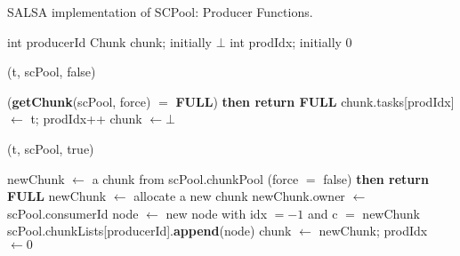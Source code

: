 \begin{algo}[!ht]
\caption{SALSA implementation of SCPool: Producer Functions.}
\label{alg:producer-non-fifo}
\scriptsize
\begin{minipage}[t]{0.48\textwidth}
\begin{distribalgo}[1]
\setcounter{ALC@line}{\value{alg:non-fifo:lines}}

	\STATE int producerId
	\STATE Chunk chunk; initially $\bot$ 
	\STATE int prodIdx; initially $0$ 
\ENDINDENT

\medskip

	(t, scPool, false)
\ENDINDENT

\medskip

		 ({\bf getChunk}(scPool, force) $=$ {\bf FULL}) {\bf then return FULL}
	\ENDINDENT
	\STATE chunk.tasks[prodIdx] $\leftarrow$ t; prodIdx++
	  \STATE chunk $\leftarrow \bot$ 
	\ENDINDENT
\ENDINDENT

\setcounter{alg:non-fifo:lines}{\value{ALC@line}} %
\end{distribalgo}
\end{minipage}%
%
\hfill
%
\begin{minipage}[t]{0.48\textwidth}
%
\begin{distribalgo}[1]
\setcounter{ALC@line}{\value{alg:non-fifo:lines}}

	(t, scPool, true)
\ENDINDENT

\medskip

	\STATE newChunk $\leftarrow$ a chunk from scPool.chunkPool
		 (force $=$ false) {\bf then return FULL} 
		 \STATE newChunk $\leftarrow$ allocate a new chunk
	\ENDINDENT
	\STATE newChunk.owner $\leftarrow$ scPool.consumerId
	\STATE node $\leftarrow$ new node with idx $=-1$ and c $=$ newChunk
	\STATE scPool.chunkLists[producerId].{\bf append}(node)
	\STATE chunk $\leftarrow$ newChunk; prodIdx $\leftarrow 0$ 
\ENDINDENT

\setcounter{alg:non-fifo:lines}{\value{ALC@line}}
\end{distribalgo}
\end{minipage}
\end{algo}
